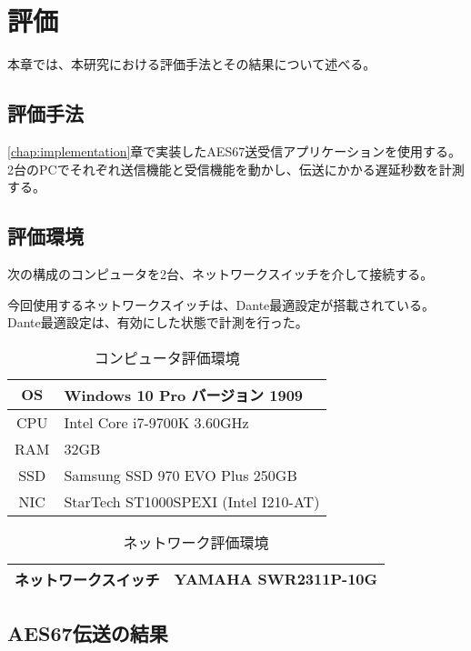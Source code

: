\chapter{評価}
\label{chap:evaluation}

本章では、本研究における評価手法とその結果について述べる。

\section{評価手法}

\ref{chap:implementation}章で実装したAES67送受信アプリケーションを使用する。2台のPCでそれぞれ送信機能と受信機能を動かし、伝送にかかる遅延秒数を計測する。

\section{評価環境}

次の構成のコンピュータを2台、ネットワークスイッチを介して接続する。

今回使用するネットワークスイッチは、Dante最適設定が搭載されている。Dante最適設定は、有効にした状態で計測を行った。

\begin{table}[htb]
  \label{tab:evaluation_computer}
  \caption{コンピュータ評価環境}
  \centering
  \begin{tabular}{c|l} \hline
    OS & Windows 10 Pro バージョン 1909 \\ \hline
    CPU & Intel Core i7-9700K 3.60GHz \\ \hline
    RAM & 32GB \\ \hline
    SSD & Samsung SSD 970 EVO Plus 250GB \\ \hline
    NIC & StarTech ST1000SPEXI (Intel I210-AT) \\ \hline
  \end{tabular}
\end{table}

\begin{table}[htb]
  \label{tab:evaluation_network}
  \caption{ネットワーク評価環境}
  \centering
  \begin{tabular}{c|l} \hline
    ネットワークスイッチ & YAMAHA SWR2311P-10G \\ \hline
  \end{tabular}
\end{table}

\section{AES67伝送の結果}


